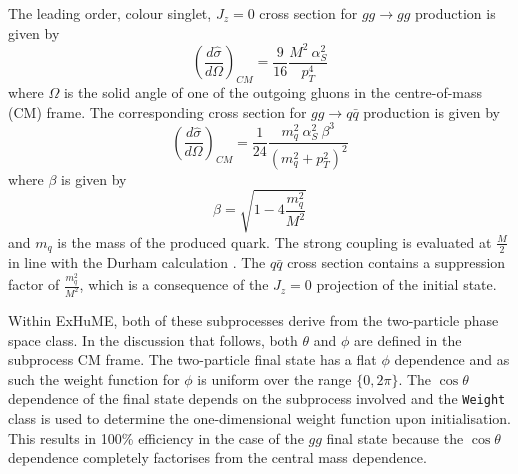 The leading order, colour singlet, $J_z=0$ cross section for $gg \rightarrow gg$ production is given \cite{Khoze:2001xm} by
\begin{equation}\label{cepgg}
\left(\frac{d\hat{\sigma}}{d\Omega}\right)_{CM}=%
\frac{9}{16}\frac{M^2~\alpha_{S}^2}{p_T^4}
\end{equation}
where $\Omega$ is the solid angle of one of the outgoing gluons in the centre-of-mass (CM) frame. The corresponding cross section for $gg\rightarrow q\bar{q}$ production is given by
\begin{equation}\label{cepqqbar}
\left(\frac{d\hat{\sigma}}{d\Omega}\right)_{CM}=%
\frac{1}{24}\frac{m_q^2~\alpha_S^2~\beta^3}{\left(m_q^2 + p_T^2\right)^2}
\end{equation}
where $\beta$ is given by
\begin{equation}
\beta = \sqrt{1 - 4\frac{m_q^2}{M^2}}
\end{equation}
and $m_q$ is the mass of the produced quark. The strong coupling is evaluated at $\frac{M}{2}$ in line with the Durham calculation \cite{Khoze:2001xm}. The $q\bar{q}$ cross section contains a suppression factor of $\frac{m_q^2}{M^2}$, which is a consequence of the $J_z=0$ projection of the initial state. 

Within ExHuME, both of these subprocesses derive from the two-particle phase space class. In the discussion that follows, both $\theta$ and $\phi$ are defined in the subprocess CM frame. The two-particle final state has a flat $\phi$ dependence and as such the weight function for $\phi$ is uniform over the range $\{0, 2\pi\}$. The $\cos\theta$ dependence of the final state depends on the subprocess involved and the \texttt{Weight} class is used to determine the one-dimensional weight function upon initialisation.
This results in 100\% efficiency in the case of the $gg$ final state because the $\cos\theta$ dependence completely factorises from the central mass dependence. 

